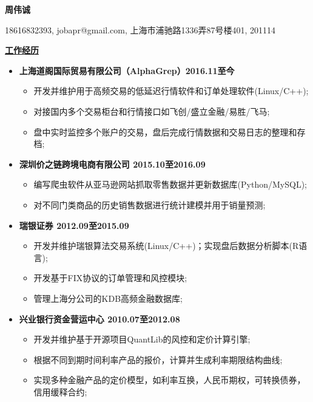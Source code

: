 \documentclass[a4paper]{article}
\begin{document}
  \begin{center} {\bfseries {} 周伟诚}
  
  \vspace{2ex}
   18616832393, jobapr@gmail.com, 上海市浦驰路1336弄87号楼401, 201114
  \end{center}


\vspace{2.5ex}
\textbf  { \uline{工作经历}}
\vspace{0.005ex}

\begin{itemize}
  \setlength{\topsep}{10ex}
  \setlength{\itemsep}{1.3ex}
  \setlength{\parsep}{10ex}
  \setlength{\parskip}{0ex}
	\item  {\bfseries {}上海道阁国际贸易有限公司（AlphaGrep）\hfill 2016.11至今}
		\begin{itemize}
		\item 开发并维护用于高频交易的低延迟行情软件和订单处理软件(Linux/C++);
		\item 对接国内多个交易柜台和行情接口如飞创/盛立金融/易胜/飞马;
		\item 盘中实时监控多个账户的交易，盘后完成行情数据和交易日志的整理和存档;
		\end{itemize}
	\item  {\bfseries {}深圳价之链跨境电商有限公司 \hfill 2015.10至2016.09}
		\begin{itemize}
		\item 编写爬虫软件从亚马逊网站抓取零售数据并更新数据库(Python/MySQL);
		\item 对不同门类商品的历史销售数据进行统计建模并用于销量预测;
		\end{itemize}
	
	\item  {\bfseries {} 瑞银证券 \hfill 2012.09至2015.09}
		\begin{itemize}
		\item 开发并维护瑞银算法交易系统(Linux/C++)；实现盘后数据分析脚本(R语言);
		\item 开发基于FIX协议的订单管理和风控模块;
		\item 管理上海分公司的KDB高频金融数据库;
		\end{itemize}
	
	\item  {\bfseries {} 兴业银行资金营运中心 \hfill 2010.07至2012.08}
		\begin{itemize}
		\item 开发并维护基于开源项目QuantLib的风控和定价计算引擎;
		\item 根据不同到期时间利率产品的报价，计算并生成利率期限结构曲线; 
		\item 实现多种金融产品的定价模型，如利率互换，人民币期权，可转换债券，信用缓释合约;
		\end{itemize}
\end{itemize}
\end{document}
